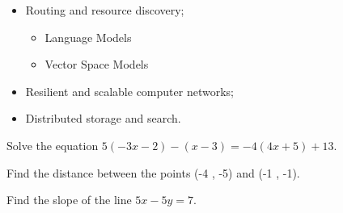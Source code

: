 \documentclass[11pt]{elegantbook}
\begin{document}
\lipsum[1-2]

\begin{itemize}
  \item Routing and resource discovery;
       \begin{itemize} 
             \item Language Models
            \item Vector Space Models
         \end{itemize}
  \item Resilient and scalable computer networks;
  \item Distributed storage and search.
\end{itemize}

\begin{problemset}
  \item Solve the equation $5(- 3x - 2) - (x - 3) = -4(4x + 5) + 13$.
  \item Find the distance between the points (-4 , -5) and (-1 , -1). 
  \item Find the slope of the line $5x - 5y = 7$.
\end{problemset}
\end{document}

